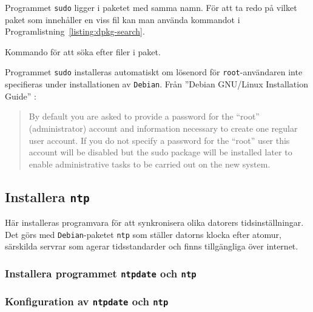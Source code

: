 Programmet \texttt{sudo} ligger i paketet med samma namn.
För att ta redo på vilket paket som innehåller en viss fil kan man använda
kommandot i Programlistning~\ref{listing:dpkg-search}.

\begin{listing}[H]
\caption{Kommando för att söka efter filer i paket.}
\label{listing:dpkg-search}
\end{listing}

Programmet \texttt{sudo} installeras automatiskt om lösenord för
\texttt{root}-användaren inte specifieras under installationen av
\texttt{Debian}. Från ''Debian GNU\slash Linux Installation Guide''
\cite{debian:install}:

\begin{quotation}
By default you are asked to provide a password for the “root” (administrator)
account and information necessary to create one regular user account. If you do
not specify a password for the “root” user this account will be disabled but
the sudo package will be installed later to enable administrative tasks to be
carried out on the new system. 
\end{quotation}

\subsection{Installera \texttt{ntp}}
Här installeras programvara för att synkronisera olika datorers
tidsinställningar.  Det görs med \texttt{Debian}-paketet \texttt{ntp} som
ställer datorns klocka efter atomur, särskilda servrar som agerar
tidsstandarder och finns tillgängliga över internet.

\subsubsection{Installera programmet \texttt{ntpdate} och \texttt{ntp}}

\subsubsection{Konfiguration av \texttt{ntpdate} och \texttt{ntp}}
%

